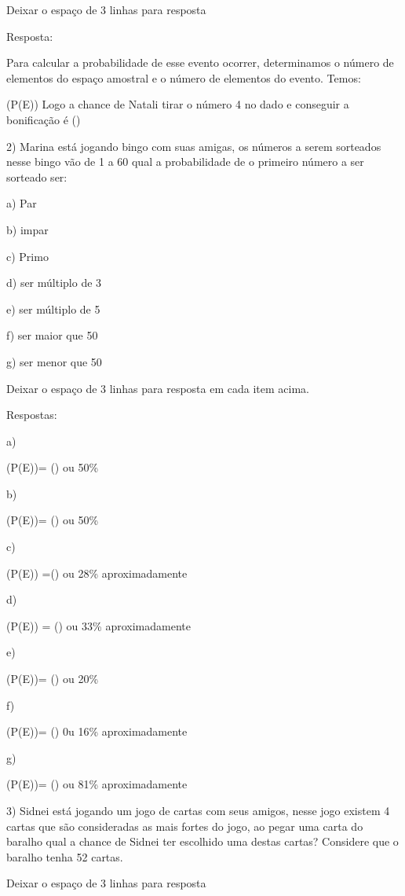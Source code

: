 Deixar o espaço de 3 linhas para resposta

Resposta:

Para calcular a probabilidade de esse evento ocorrer, determinamos o
número de elementos do espaço amostral e o número de elementos do
evento. Temos:

(P(E)) Logo a chance de Natali tirar o número 4 no
dado e conseguir a bonificação é ()

2) Marina está jogando bingo com suas amigas, os números a serem
sorteados nesse bingo vão de 1 a 60 qual a probabilidade de o primeiro
número a ser sorteado ser:

a) Par

b) impar

c) Primo

d) ser múltiplo de 3

e) ser múltiplo de 5

f) ser maior que 50

g) ser menor que 50

Deixar o espaço de 3 linhas para resposta em cada item acima.

Respostas:

a)

(P(E))= () ou 50\%

b)

(P(E))= () ou 50\%

c)

(P(E)) =() ou 28\% aproximadamente

d)

(P(E)) = () ou 33\% aproximadamente

e)

(P(E))= () ou 20\%

f)

(P(E))= () 0u 16\% aproximadamente

g)

(P(E))= () ou 81\% aproximadamente

3) Sidnei está jogando um jogo de cartas com seus amigos, nesse jogo
existem 4 cartas que são consideradas as mais fortes do jogo, ao pegar
uma carta do baralho qual a chance de Sidnei ter escolhido uma destas
cartas? Considere que o baralho tenha 52 cartas.

Deixar o espaço de 3 linhas para resposta

